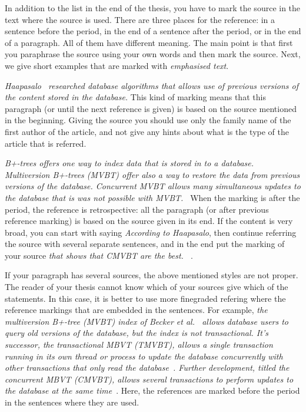 \documentclass[12pt,a4paper,oneside,pdftex]{report}
\begin{document}
In addition to the list in the end of the thesis, you have to mark the
source in the text where the source is used. There are three places
for the reference: in a sentence before the period, in the end of a
sentence after the period, or in the end of a paragraph. All of them
have different meaning. The main point is that first you paraphrase
the source using your own words and then mark the source. Next, we
give short examples that are marked with \emph{emphasised text}.

\emph{Haapasalo~\cite{HaapasaloThesis} researched database algorithms
  that allows use of previous versions of the content stored in the
  database.} This kind of marking means that this paragraph (or until
the next reference is given) is based on the source mentioned in the
beginning. Giving the source you should use only the family name of
the first author of the article, and not give any hints about what is
the type of the article that is referred.

\emph{B+-trees offers one way to index data that is stored in to a
  database. Multiversion B+-trees (MVBT) offer also a way to restore
  the data from previous versions of the database. Concurrent MVBT
  allows many simultaneous updates to the database that is was not
  possible with MVBT.~\cite{HaapasaloThesis}} When the marking is
after the period, the reference is retrospective: all the paragraph
(or after previous reference marking) is based on the source given in
its end. If the content is very broad, you can start with saying
\emph{According to Haapasalo}, then continue referring the source with
several separate sentences, and in the end put the marking of your
source \emph{ that shows that CMVBT are the
  best. ~\cite{HaapasaloThesis}}.

If your paragraph has several sources, the above mentioned styles are
not proper. The reader of your thesis cannot know which of your
sources give which of the statements. In this case, it is better to
use more finegraded refering where the reference markings that are
embedded in the sentences. For example, \emph{the multiversion B+-tree
  (MVBT) index of Becker et al.~\cite{becker:1996:mvbt} allows database
  users to query old versions of the database, but the index is not
  transactional.
  It's successor, the transactional MBVT (TMVBT), allows a single transaction
  running in its own thread or process to update the database concurrently
  with other transactions that only read the
  database~\cite{haapasalo:2009:tmvbt}.
  Further development, titled the concurrent MBVT (CMVBT),
  allows several transactions to perform updates to the database at the same
  time~\cite{HaapasaloThesis}}.
  Here, the references are marked before
  the period in the sentences where they are used.
\end{document}
